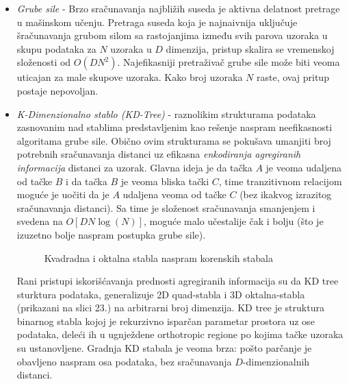 \documentclass[fontsize=12bp, paper=a4]{scrarticle}
\begin{document}
\begin{itemize}
    \item \textit{Grube sile} - Brzo sračunavanja najbližih suseda je aktivna delatnost pretrage u mašinskom učenju. Pretraga suseda koja je najnaivnija uključuje šračunavanja grubom silom sa rastojanjima između svih parova uzoraka u skupu podataka za $N$ uzoraka u $D$ dimenzija, pristup skalira se vremenskoj složenosti od $O(DN^2)$. Najefikasniji pretraživač grube sile može biti veoma uticajan za male skupove uzoraka. Kako broj uzoraka $N$ raste, ovaj pritup postaje nepovoljan.
    \item \textit{K-Dimenzionalno stablo (KD-Tree)} - raznolikim strukturama podataka zasnovanim nad stablima predstavljenim kao rešenje naspram neefikasnosti algoritama grube sile. Obično ovim strukturama se pokušava umanjiti broj potrebnih sračunavanja distanci uz efikasna \textit{enkodiranja agregiranih informacija} distanci za uzorak. Glavna ideja je da tačka $A$ je veoma udaljena od tačke $B$ i da tačka $B$ je veoma bliska tački $C$, time tranzitivnom relacijom moguće je uočiti da je $A$ udaljena veoma od tačke $C$ (bez ikakvog izrazitog sračunavanja distanci). Sa time je složenost sračunavanja smanjenjem i svedena na $O[D N \log(N)]$, moguće malo učestalije čak i bolju (što je izuzetno bolje naspram postupka grube sile).
    
        \begin{figure}[h!]
            \centering
            \caption{Kvadradna i oktalna stabla naspram korenskih stabala}
        \end{figure}
    
        
    
    Rani pristupi iskorišćavanja prednosti agregiranih informacija su da KD tree sturktura podataka, generalizuje 2D quad-stabla i 3D oktalna-stabla (prikazani na slici 23.) na arbitrarni broj dimenzija. KD tree je struktura binarnog stabla kojoj je rekurzivno isparčan parametar prostora uz ose podataka, deleći ih u ugnježdene orthotropic regione po kojima tačke uzoraka su ustanovljene. Gradnja KD stabala je veoma brza: pošto parčanje je obavljeno naspram osa podataka, bez sračunavanja $D$-dimenzionalnih distanci. 
    

\end{itemize}
\end{document}
